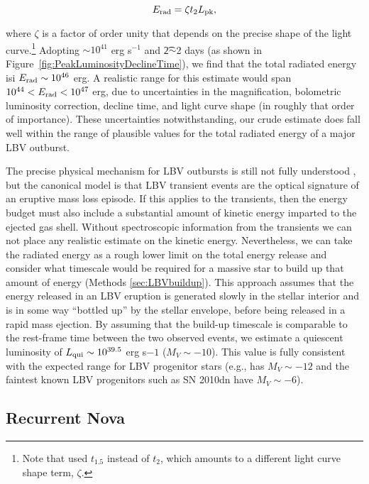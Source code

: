 \begin{equation}
  \label{eqn:Erad}
  E_{\rm rad} = \zeta \t2 \Lpk,
\end{equation}

\noindent where $\zeta$ is a factor of order unity that depends on the
precise shape of the light curve.\footnote{Note that
  \citet{Smith:2011b} used $t_{1.5}$ instead of $t_2$, which amounts
  to a different light curve shape term, $\zeta$.}  Adopting
\Lpk$\sim10^{41}$ erg s$^{-1}$ and \t2$\sim$2 days (as shown in
Figure~\ref{fig:PeakLuminosityDeclineTime}), we find that the total
radiated energy isi $E_{\rm rad}\sim10^{46}$ erg.  A realistic range
for this estimate would span $10^{44}<E_{\rm rad}<10^{47}$ erg, due to
uncertainties in the magnification, bolometric luminosity correction,
decline time, and light curve shape (in roughly that order of
importance). These uncertainties notwithstanding, our crude estimate
does fall well within the range of plausible values for the total
radiated energy of a major LBV outburst.

The precise physical mechanism for LBV outbursts is still not fully
understood \citep[e.g.][]{Smith:2006,Woosley:2007,Dessart:2010}, but
the canonical model is that LBV transient events are the optical
signature of an eruptive mass loss episode.  If this applies to the
\spock transients, then the energy budget must also include a
substantial amount of kinetic energy imparted to the ejected gas
shell. Without spectroscopic information from the \spock transients we
can not place any realistic estimate on the kinetic
energy. Nevertheless, we can take the radiated energy as a rough lower
limit on the total energy release and consider what timescale would be
required for a massive star to build up that amount of energy (Methods \ref{sec:LBVbuildup}). This approach assumes that the energy
released in an LBV eruption is generated slowly in the stellar
interior and is in some way ``bottled up'' by the stellar envelope,
before being released in a rapid mass ejection.  By assuming that the
build-up timescale is comparable to the rest-frame time between the
two observed events, we estimate a quiescent luminosity of $L_{\rm
  qui}\sim10^{39.5}$ erg s${-1}$ ($M_V\sim-10$).  This value is fully
consistent with the expected range for LBV progenitor stars (e.g.,
\etacar has $M_V\sim-12$ and the faintest known LBV progenitors such
as SN 2010dn have $M_V\sim-6$).


\subsection{Recurrent Nova}\label{sec:RNe}


